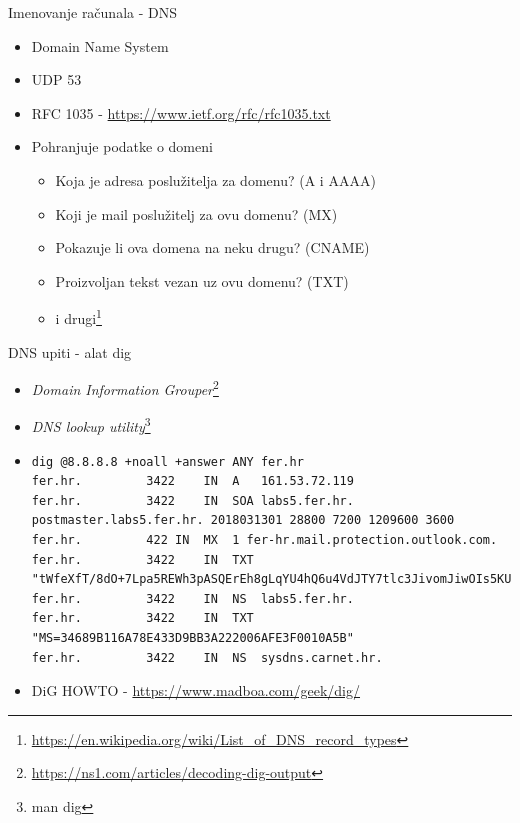 \documentclass[t]{beamer}
\begin{document}
\begin{frame}{Imenovanje računala - DNS}
    \begin{itemize}
        \item Domain Name System
        \item UDP 53
        \item RFC 1035 - \url{https://www.ietf.org/rfc/rfc1035.txt}
        \item Pohranjuje podatke o domeni
        \begin{itemize}
            \item Koja je adresa poslužitelja za domenu? (A i AAAA)
            \item Koji je mail poslužitelj za ovu domenu? (MX)
            \item Pokazuje li ova domena na neku drugu? (CNAME)
            \item Proizvoljan tekst vezan uz ovu domenu? (TXT)
            \item i drugi\footnote{\url{https://en.wikipedia.org/wiki/List_of_DNS_record_types}}
        \end{itemize}
    \end{itemize}
\end{frame}

\begin{frame}[fragile]{DNS upiti - alat dig}
    \begin{itemize}
        \item \textit{Domain Information Grouper}\footnote{\url{https://ns1.com/articles/decoding-dig-output}}
        \item \textit{DNS lookup utility}\footnote{man dig}
        \item {\footnotesize \begin{verbatim}
dig @8.8.8.8 +noall +answer ANY fer.hr
fer.hr.			3422	IN	A	161.53.72.119
fer.hr.			3422	IN	SOA	labs5.fer.hr. postmaster.labs5.fer.hr. 2018031301 28800 7200 1209600 3600
fer.hr.			422	IN	MX	1 fer-hr.mail.protection.outlook.com.
fer.hr.			3422	IN	TXT	"tWfeXfT/8dO+7Lpa5REWh3pASQErEh8gLqYU4hQ6u4VdJTY7tlc3JivomJiwOIs5KUDOmcgQUs3mtcbG+rBhnQ=="
fer.hr.			3422	IN	NS	labs5.fer.hr.
fer.hr.			3422	IN	TXT	"MS=34689B116A78E433D9BB3A222006AFE3F0010A5B"
fer.hr.			3422	IN	NS	sysdns.carnet.hr.
        \end{verbatim}}
        \item DiG HOWTO - \url{https://www.madboa.com/geek/dig/}
    \end{itemize}
\end{frame}
\end{document}
